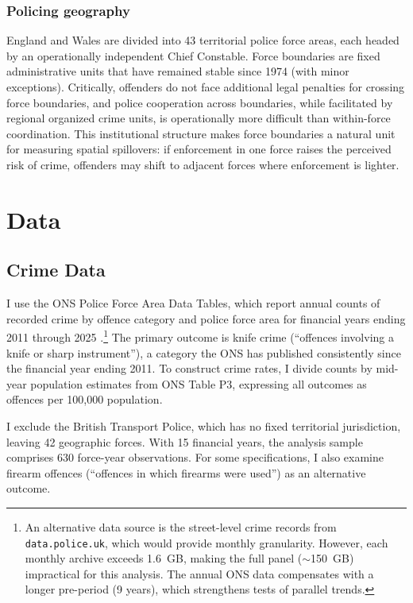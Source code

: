 \documentclass[12pt]{article}
\begin{document}
\subsubsection*{Policing geography} England and Wales are divided into 43 territorial police force areas, each headed by an operationally independent Chief Constable. Force boundaries are fixed administrative units that have remained stable since 1974 (with minor exceptions). Critically, offenders do not face additional legal penalties for crossing force boundaries, and police cooperation across boundaries, while facilitated by regional organized crime units, is operationally more difficult than within-force coordination. This institutional structure makes force boundaries a natural unit for measuring spatial spillovers: if enforcement in one force raises the perceived risk of crime, offenders may shift to adjacent forces where enforcement is lighter.


\section{Data}
\label{sec:data}

\subsection{Crime Data}

I use the ONS Police Force Area Data Tables, which report annual counts of recorded crime by offence category and police force area for financial years ending 2011 through 2025 \citep{ons2024pfa}.\footnote{An alternative data source is the street-level crime records from \texttt{data.police.uk}, which would provide monthly granularity. However, each monthly archive exceeds 1.6~GB, making the full panel ($\sim$150~GB) impractical for this analysis. The annual ONS data compensates with a longer pre-period (9 years), which strengthens tests of parallel trends.} The primary outcome is knife crime (``offences involving a knife or sharp instrument''), a category the ONS has published consistently since the financial year ending 2011. To construct crime rates, I divide counts by mid-year population estimates from ONS Table P3, expressing all outcomes as offences per 100,000 population.

I exclude the British Transport Police, which has no fixed territorial jurisdiction, leaving 42 geographic forces. With 15 financial years, the analysis sample comprises 630 force-year observations. For some specifications, I also examine firearm offences (``offences in which firearms were used'') as an alternative outcome.
\end{document}
